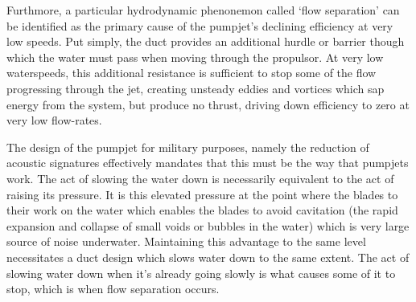 \documentclass{article}\usepackage[]{graphicx}\usepackage[]{color}
\begin{document}
Furthmore, a particular hydrodynamic phenonemon called `flow separation' can be identified as the primary cause of the pumpjet's declining efficiency at very low speeds. Put simply, the duct provides an additional hurdle or barrier though which the water must pass when moving through the propulsor.  At very low waterspeeds, this additional resistance is sufficient to stop some of the flow progressing through the jet, creating unsteady eddies and vortices which sap energy from the system, but produce no thrust, driving down efficiency to zero at very low flow-rates.

The design of the pumpjet for military purposes, namely the reduction of acoustic signatures effectively mandates that this must be the way that pumpjets work.  The act of slowing the water down is necessarily equivalent to the act of raising its pressure.  It is this elevated pressure at the point where the blades to their work on the water which enables the blades to avoid cavitation (the rapid expansion and collapse of small voids or bubbles in the water) which is very large source of noise underwater.  Maintaining this advantage to the same level necessitates a duct design which slows water down to the same extent.  The act of slowing water down when it's already going slowly is what causes some of it to stop, which is when flow separation occurs.
\end{document}
